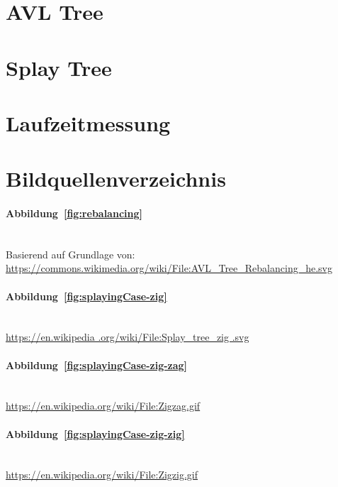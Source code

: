 \documentclass[a4paper]{article}
\begin{document}
    \section{AVL Tree}\label{sec:avl-tree}
    

    \FloatBarrier
    \newpage

    \section{Splay Tree}\label{sec:splay-tree}
    

    \FloatBarrier
    \newpage

    \section{Laufzeitmessung}\label{sec:laufzeitmessung}
    

    \FloatBarrier
    \newpage
    \appendix

    \section{Bildquellenverzeichnis}\label{sec:bildquellen}

    \paragraph{Abbildung~\ref{fig:rebalancing}}\mbox{}\\

    Basierend auf Grundlage von:\\
    \url{https://commons.wikimedia.org/wiki/File:AVL_Tree_Rebalancing_he.svg}

    \paragraph{Abbildung~\ref{fig:splayingCase-zig}}\mbox{}\\

    \url{https://en.wikipedia .org/wiki/File:Splay_tree_zig .svg}

    \paragraph{Abbildung~\ref{fig:splayingCase-zig-zag}}\mbox{}\\

    \url{https://en.wikipedia.org/wiki/File:Zigzag.gif}

    \paragraph{Abbildung~\ref{fig:splayingCase-zig-zig}}\mbox{}\\

    \url{https://en.wikipedia.org/wiki/File:Zigzig.gif}

    
\end{document}
